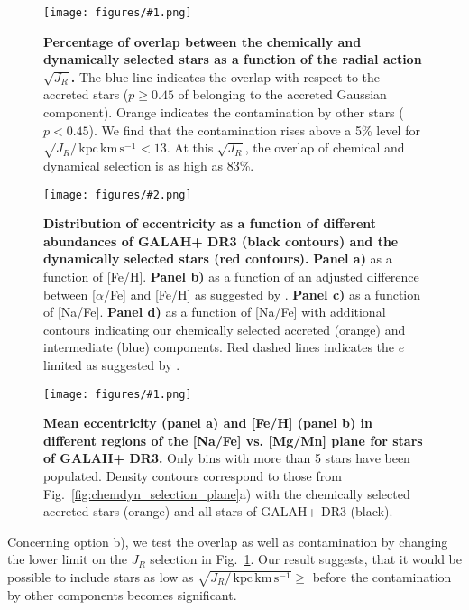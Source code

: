 \documentclass[fleqn,usenatbib]{mnras}
\newcommand{\kpckms}{\,\mathrm{kpc\,km\,s^{-1}}}	%
\newcommand{\codeicon}{{\faCloudDownload}}
\newcommand{\codelink}[1]{\href{https://github.com/svenbuder/buder_galah_accreted_chemistry/tree/main/figures/#1.ipynb}{\codeicon}\,\,}
\newcommand{\oscaption}[2]{\caption{#2 \codelink{#1}}}
\newcommand{\figuretextwidth}[4]{\begin{figure*} \centering \texttt{[image: figures/\#2.png]}\oscaption{#3}{#4}\label{fig:#2} \end{figure*}}
\newcommand{\figurecolumnwidth}[3]{\begin{figure} \centering \texttt{[image: figures/\#1.png]}\oscaption{#2}{#3}\label{fig:#1} \end{figure}}
\begin{document}
\figurecolumnwidth{sqrtJR_overlap}{chronochemodynamic_comparison}{
\textbf{Percentage of overlap between the chemically and dynamically selected stars as a function of the radial action $\sqrt{J_R}$.}
The blue line indicates the overlap with respect to the accreted stars ($p \geq 0.45$ of belonging to the accreted Gaussian component). Orange indicates the contamination by other stars ($p < 0.45$). We find that the contamination rises above a 5\% level for  $\sqrt{J_R / \kpckms} < 13$. At this $\sqrt{J_R}$, the overlap of chemical and dynamical selection is as high as 83\%.
}

\figuretextwidth{17cm}{nafe_e}{chronochemodynamic_comparison}{
\textbf{Distribution of eccentricity as a function of different abundances of GALAH+ DR3 (black contours) and the dynamically selected stars (red contours).}
\textbf{Panel a)} as a function of [Fe/H].
\textbf{Panel b)} as a function of an adjusted difference between [$\alpha$/Fe] and [Fe/H] as suggested by \citet{Naidu2020}.
\textbf{Panel c)} as a function of [Na/Fe].
\textbf{Panel d)} as a function of [Na/Fe] with additional contours indicating our chemically selected accreted (orange) and intermediate (blue) components.
Red dashed lines indicates the $e$ limited as suggested by \citet{Naidu2020}.
}

\figurecolumnwidth{NaFe_MgMn_Fe_H_ecc}{chronochemodynamic_comparison}{
\textbf{Mean eccentricity (panel a) and [Fe/H] (panel b) in different regions of the [Na/Fe] vs. [Mg/Mn] plane for stars of GALAH+ DR3.}
Only bins with more than 5 stars have been populated.
Density contours correspond to those from Fig.~\ref{fig:chemdyn_selection_plane}a) with the chemically selected accreted stars (orange) and all stars of GALAH+ DR3 (black).
}

Concerning option b), we test the overlap as well as contamination by changing the lower limit on the $J_R$ selection in Fig.~\ref{fig:sqrtJR_overlap}. Our result suggests, that it would be possible to include stars as low as $\sqrt{J_R / \kpckms} \geq $ before the contamination by other components becomes significant.
\end{document}
